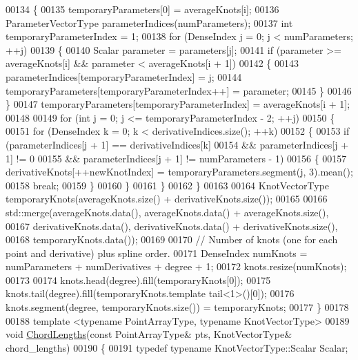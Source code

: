 \begin{DoxyCode}
00134     \{
00135       temporaryParameters[0] = averageKnots[i];
00136       ParameterVectorType parameterIndices(numParameters);
00137       \textcolor{keywordtype}{int} temporaryParameterIndex = 1;
00138       \textcolor{keywordflow}{for} (DenseIndex j = 0; j < numParameters; ++j)
00139       \{
00140         Scalar parameter = parameters[j];
00141         \textcolor{keywordflow}{if} (parameter >= averageKnots[i] && parameter < averageKnots[i + 1])
00142         \{
00143           parameterIndices[temporaryParameterIndex] = j;
00144           temporaryParameters[temporaryParameterIndex++] = parameter;
00145         \}
00146       \}
00147       temporaryParameters[temporaryParameterIndex] = averageKnots[i + 1];
00148 
00149       \textcolor{keywordflow}{for} (\textcolor{keywordtype}{int} j = 0; j <= temporaryParameterIndex - 2; ++j)
00150       \{
00151         \textcolor{keywordflow}{for} (DenseIndex k = 0; k < derivativeIndices.size(); ++k)
00152         \{
00153           \textcolor{keywordflow}{if} (parameterIndices[j + 1] == derivativeIndices[k]
00154               && parameterIndices[j + 1] != 0
00155               && parameterIndices[j + 1] != numParameters - 1)
00156           \{
00157             derivativeKnots[++newKnotIndex] = temporaryParameters.segment(j, 3).mean();
00158             \textcolor{keywordflow}{break};
00159           \}
00160         \}
00161       \}
00162     \}
00163     
00164     KnotVectorType temporaryKnots(averageKnots.size() + derivativeKnots.size());
00165 
00166     std::merge(averageKnots.data(), averageKnots.data() + averageKnots.size(),
00167                derivativeKnots.data(), derivativeKnots.data() + derivativeKnots.size(),
00168                temporaryKnots.data());
00169 
00170     \textcolor{comment}{// Number of knots (one for each point and derivative) plus spline order.}
00171     DenseIndex numKnots = numParameters + numDerivatives + degree + 1;
00172     knots.resize(numKnots);
00173 
00174     knots.head(degree).fill(temporaryKnots[0]);
00175     knots.tail(degree).fill(temporaryKnots.template tail<1>()[0]);
00176     knots.segment(degree, temporaryKnots.size()) = temporaryKnots;
00177   \}
00178 
00188   \textcolor{keyword}{template} <\textcolor{keyword}{typename} Po\textcolor{keywordtype}{int}ArrayType, \textcolor{keyword}{typename} KnotVectorType>
00189   \textcolor{keywordtype}{void} \hyperlink{group___splines___module_ga1b4cbde5d98411405871accf877552d2}{ChordLengths}(\textcolor{keyword}{const} PointArrayType& pts, KnotVectorType& chord\_lengths)
00190   \{
00191     \textcolor{keyword}{typedef} \textcolor{keyword}{typename} KnotVectorType::Scalar Scalar;

\end{DoxyCode}
